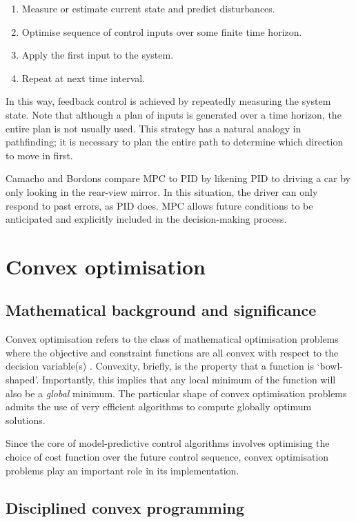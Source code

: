 \begin{enumerate}
	\item Measure or estimate current state and predict disturbances.
	\item Optimise sequence of control inputs over some finite time horizon.
	\item Apply the first input to the system.
	\item Repeat at next time interval.
\end{enumerate}

In this way, feedback control is achieved by repeatedly measuring the system state.
Note that although a plan of inputs is generated over a time horizon, the entire plan is not usually used.
This strategy has a natural analogy in pathfinding; it is necessary to plan the entire path to determine which direction to move in first.

Camacho and Bordons compare MPC to PID by likening PID to driving a car by only looking in the rear-view mirror.
In this situation, the driver can only respond to past errors, as PID does.
MPC allows future conditions to be anticipated and explicitly included in the decision-making process.

\section{Convex optimisation}

\subsection{Mathematical background and significance}

Convex optimisation refers to the class of mathematical optimisation problems where the objective and constraint functions are all convex with respect to the decision variable(s) \cite{Boyd04}.
Convexity, briefly, is the property that a function is `bowl-shaped'.
Importantly, this implies that any local minimum of the function will also be a {\it global} minimum.
The particular shape of convex optimisation problems admits the use of very efficient algorithms to compute globally optimum solutions.

Since the core of model-predictive control algorithms involves optimising the choice of cost function over the future control sequence, convex optimisation problems play an important role in its implementation.

\subsection{Disciplined convex programming}

